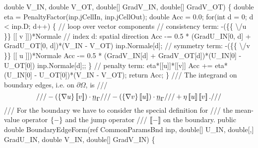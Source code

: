 {\btab \btab double V\_IN, double V\_OT, double[] GradV\_IN, double[] GradV\_OT) \{\newline 
 \newline 
\btab \btab double eta = PenaltyFactor(inp.jCellIn, inp.jCellOut);\newline 
 \newline 
\btab \btab double Acc = 0.0;\newline 
\btab \btab for(int d = 0; d < inp.D; d++) \{ // loop over vector components \newline 
\btab \btab \btab // consistency term: -(\{\{ \textbackslash /u \}\} [[ v ]])*Normale\newline 
\btab \btab \btab // index d: spatial direction\newline 
\btab \btab \btab Acc -= 0.5 * (GradU\_IN[0, d] + GradU\_OT[0, d])*(V\_IN - V\_OT)\newline 
\btab \btab \btab \btab \btab    * inp.Normale[d];\newline 
 \newline 
\btab \btab \btab // symmetry term: -(\{\{ \textbackslash /v \}\} [[ u ]])*Normale\newline 
\btab \btab \btab Acc -= 0.5 * (GradV\_IN[d] + GradV\_OT[d])*(U\_IN[0] - U\_OT[0])\newline 
\btab \btab \btab \btab \btab    * inp.Normale[d];;\newline 
\btab \btab \}\newline 
 \newline 
\btab \btab // penalty term: eta*[[u]]*[[v]]\newline 
\btab \btab Acc += eta*(U\_IN[0] - U\_OT[0])*(V\_IN - V\_OT);\newline 
\btab \btab return Acc;\newline 
\btab \} \newline 
    /// The integrand on boundary edges, i.e. on $\partial \Omega$, is
    /// \[ 
    ///   -( \mean{ \nabla u } \jump{ v }) \cdot \vec{n}_{\Gamma} 
    ///   -( \mean{ \nabla v } \jump{ u }) \cdot \vec{n}_{\Gamma} 
    ///   +  \eta \jump{ u }  \jump{v} .
    /// \]
    /// For the boundary we have to consider the special definition for 
    /// the mean-value operator $\left\{{-}\right\}$ and the jump operator 
    /// $\left[\!\left[{-}\right]\!\right]$ on the boundary.
\btab public double BoundaryEdgeForm(ref CommonParamsBnd inp, \newline 
\btab \btab double[] U\_IN, double[,] GradU\_IN, double V\_IN, double[] GradV\_IN) \{\newline 
 \newline 
}
